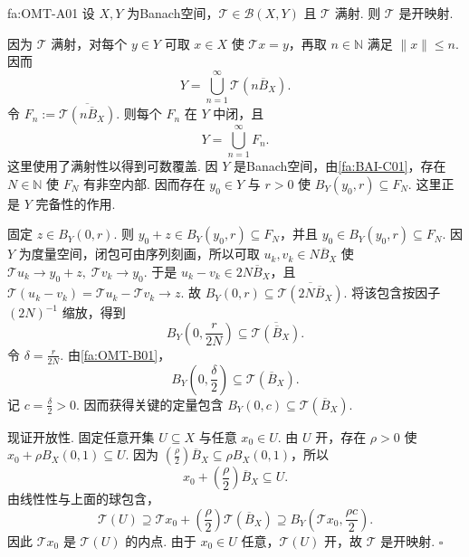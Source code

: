 \begin{FATheorem}[A][开映射定理]{fa:OMT-A01}
设 \(\displaystyle X,Y\) 为Banach空间，\(\displaystyle \mathcal T\in\mathcal B(X,Y)\) 且 \(\displaystyle \mathcal T\) 满射. 则 \(\displaystyle \mathcal T\) 是开映射.
\end{FATheorem}

\begin{FAProof}
因为 \(\displaystyle \mathcal T\) 满射，对每个 \(\displaystyle y\in Y\) 可取 \(\displaystyle x\in X\) 使 \(\displaystyle \mathcal T x=y\)，再取 \(\displaystyle n\in\mathbb N\) 满足 \(\displaystyle \|x\|\leqslant n\). 因而
\[
Y=\bigcup_{n=1}^{\infty}\mathcal T(n\overline B_X).
\]
令
\(\displaystyle F_n:=\overline{\mathcal T(n\overline B_X)}\).
则每个 \(\displaystyle F_n\) 在 \(\displaystyle Y\) 中闭，且
\[
Y=\bigcup_{n=1}^{\infty}F_n.
\]
这里使用了满射性以得到可数覆盖. 因 \(\displaystyle Y\) 是Banach空间，由\autoref{fa:BAI-C01}，存在 \(\displaystyle N\in\mathbb N\) 使 \(\displaystyle F_N\) 有非空内部. 因而存在 \(\displaystyle y_0\in Y\) 与 \(\displaystyle r>0\) 使
\(\displaystyle B_Y(y_0,r)\subseteq F_N\).
这里正是 \(\displaystyle Y\) 完备性的作用.

固定 \(\displaystyle z\in B_Y(0,r)\). 则 \(\displaystyle y_0+z\in B_Y(y_0,r)\subseteq F_N\)，并且 \(\displaystyle y_0\in B_Y(y_0,r)\subseteq F_N\). 因 \(\displaystyle Y\) 为度量空间，闭包可由序列刻画，所以可取 \(\displaystyle u_k,v_k\in N\overline B_X\) 使
\(\displaystyle \mathcal T u_k\to y_0+z, \; \mathcal T v_k\to y_0\).
于是 \(\displaystyle u_k-v_k\in2N\overline B_X\)，且
\(\displaystyle \mathcal T(u_k-v_k) =\mathcal T u_k-\mathcal T v_k \to z\).
故
\(\displaystyle B_Y(0,r) \subseteq \overline{\mathcal T(2N\overline B_X)}\).
将该包含按因子 \(\displaystyle (2N)^{-1}\) 缩放，得到
\[
B_Y\left(0,\frac{r}{2N}\right)
\subseteq
\overline{\mathcal T(\overline B_X)}.
\]
令 \(\displaystyle \delta=\frac{r}{2N}\). 由\autoref{fa:OMT-B01}，
\[
B_Y(0,\frac{\delta}{2})
\subseteq
\mathcal T(\overline B_X).
\]
记 \(\displaystyle c=\frac{\delta}{2}>0\). 因而获得关键的定量包含
\(\displaystyle B_Y(0,c)\subseteq\mathcal T(\overline B_X)\).

现证开放性. 固定任意开集 \(\displaystyle U\subseteq X\) 与任意 \(\displaystyle x_0\in U\). 由 \(\displaystyle U\) 开，存在 \(\displaystyle \rho>0\) 使
\(\displaystyle x_0+\rho B_X(0,1)\subseteq U\).
因为 \(\displaystyle (\frac{\rho}{2})\overline B_X\subseteq\rho B_X(0,1)\)，所以
\[
x_0+(\frac{\rho}{2})\overline B_X\subseteq U.
\]
由线性性与上面的球包含，
\[
\mathcal T(U) \supseteq\mathcal T x_0+(\frac{\rho}{2})\mathcal T(\overline B_X) \supseteq B_Y\left(\mathcal T x_0,\frac{\rho c}{2}\right).
\]
因此 \(\displaystyle \mathcal T x_0\) 是 \(\displaystyle \mathcal T(U)\) 的内点. 由于 \(\displaystyle x_0\in U\) 任意，\(\displaystyle \mathcal T(U)\) 开，故 \(\displaystyle \mathcal T\) 是开映射.
\hfill\(\square\)
\end{FAProof}

